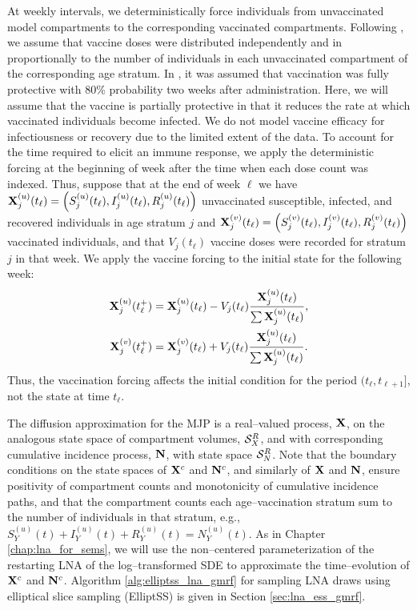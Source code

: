At weekly intervals, we deterministically force individuals from unvaccinated model compartments to the corresponding vaccinated compartments. Following \cite{shubin2016revealing}, we assume that vaccine doses were distributed independently and in proportionally to the number of individuals in each unvaccinated compartment of the corresponding age stratum. In \cite{shubin2016revealing}, it was assumed that vaccination was fully protective with 80\% probability two weeks after administration. Here, we will assume that the vaccine is partially protective in that it reduces the rate at which vaccinated individuals become infected. We do not model vaccine efficacy for infectiousness or recovery due to the limited extent of the data. To account for the time required to elicit an immune response, we apply the deterministic forcing at the beginning of week after the time when each dose count was indexed. Thus, suppose that at the end of week $ \ell $ we have $ \mathbf{X}_j^{(u)}(t_\ell) = \left (S_j^{(u)}(t_\ell), I_j^{(u)}(t_\ell), R_j^{(u)}(t_\ell)\right ) $ unvaccinated susceptible, infected, and recovered individuals in age stratum $ j $ and $ \mathbf{X}_j^{(v)}(t_\ell) = \left (S_j^{(v)}(t_\ell), I_j^{(v)}(t_\ell), R_j^{(v)}(t_\ell)\right ) $ vaccinated individuals, and that $ V_j(t_\ell) $ vaccine doses were recorded for stratum $ j $ in that week. We apply the vaccine forcing to the initial state for the following week: 
\begin{align}
\label{eqn:vacc_forcing}
\begin{split}
	\mathbf{X}_{j}^{(u)}(t_\ell^+) &= \mathbf{X}_j^{(u)}(t_\ell) - V_j(t_\ell)\frac{\mathbf{X}_{j}^{(u)}(t_\ell)}{\sum\mathbf{X}_{j}^{(u)}(t_\ell)}, \\
	\mathbf{X}_{j}^{(v)}(t_\ell^+) &= \mathbf{X}_j^{(v)}(t_\ell) + V_j(t_\ell)\frac{\mathbf{X}_{j}^{(u)}(t_\ell)}{\sum\mathbf{X}_{j}^{(u)}(t_\ell)}.
\end{split}
\end{align}
Thus, the vaccination forcing affects the initial condition for the period $ (t_\ell,t_{\ell+1}] $, not the state at time $ t_\ell $. 

The diffusion approximation for the MJP is a real--valued process, $ \mathbf{X} $, on the analogous state space of compartment volumes, $ \mathcal{S}_X^R $, and with corresponding cumulative incidence process, $ \mathbf{N} $, with state space $ \mathcal{S}_N^R $. Note that the boundary conditions on the state spaces of $ \mathbf{X}^c $ and $ \mathbf{N}^c $, and similarly of $ \mathbf{X} $ and $ \mathbf{N} $, ensure positivity of compartment counts and monotonicity of cumulative incidence paths, and that the compartment counts each age--vaccination stratum sum to the number of individuals in that stratum, e.g., $ S_{Y}^{(u)}(t) + I_{Y}^{(u)}(t) + R_{Y}^{(u)}(t) = N_{Y}^{(u)}(t) $. As in Chapter \ref{chap:lna_for_sems}, we will use the non--centered parameterization of the restarting LNA of the log--transformed SDE to approximate the time--evolution of $ \mathbf{X}^c $ and $ \mathbf{N}^c $. Algorithm \ref{alg:elliptss_lna_gmrf} for sampling LNA draws using elliptical slice sampling (ElliptSS) is given in Section \ref{sec:lna_ess_gmrf}.

